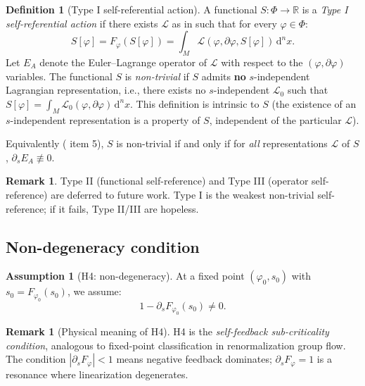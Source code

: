 \documentclass[12pt,letterpaper]{article}
\theoremstyle{definition}
\newtheorem{definition}[theorem]{Definition}
\newtheorem{assumption}[theorem]{Assumption}
\newtheorem{remark}[theorem]{Remark}
\newcommand{\mL}{\mathcal{L}}
\newcommand{\mPhi}{\Phi}
\newcommand{\R}{\mathbb{R}}
\newcommand{\diff}{\mathrm{d}}
\newcommand{\dVol}{\,\diff^n x}
\begin{document}
\begin{definition}[Type I self-referential action]
\label{def:typeI}
A functional $S: \mPhi \to \R$ is a \emph{Type I self-referential action} if there exists $\mL$ as in  such that for every $\varphi \in \mPhi$:
\[ S[\varphi] = F_\varphi(S[\varphi]) = \int_M \mL(\varphi, \partial\varphi, S[\varphi]) \dVol. \]
Let $E_A$ denote the Euler--Lagrange operator of $\mL$ with respect to the $(\varphi, \partial\varphi)$ variables. The functional $S$ is \emph{non-trivial} if $S$ admits \textbf{no} $s$-independent Lagrangian representation, i.e., there exists no $s$-independent $\mL_0$ such that $S[\varphi] = \int_M \mL_0(\varphi, \partial\varphi) \dVol$. This definition is intrinsic to $S$ (the existence of an $s$-independent representation is a property of $S$, independent of the particular $\mL$).

Equivalently ( item 5), $S$ is non-trivial if and only if for \emph{all} representations $\mL$ of $S$, $\partial_s E_A \not\equiv 0$.
\end{definition}

\begin{remark}
Type II (functional self-reference) and Type III (operator self-reference) are deferred to future work. Type I is the weakest non-trivial self-reference; if it fails, Type II/III are hopeless.
\end{remark}

\subsection{Non-degeneracy condition}

\begin{assumption}[H4: non-degeneracy]
\label{ass:h4}
At a fixed point $(\varphi_0, s_0)$ with $s_0 = F_{\varphi_0}(s_0)$, we assume:
\[ 1 - \partial_s F_{\varphi_0}(s_0) \neq 0. \tag{H4} \]
\end{assumption}

\begin{remark}[Physical meaning of H4]
H4 is the \emph{self-feedback sub-criticality condition}, analogous to fixed-point classification in renormalization group flow. The condition $|\partial_s F_\varphi| < 1$ means negative feedback dominates; $\partial_s F_\varphi = 1$ is a resonance where linearization degenerates.
\end{remark}
\end{document}
